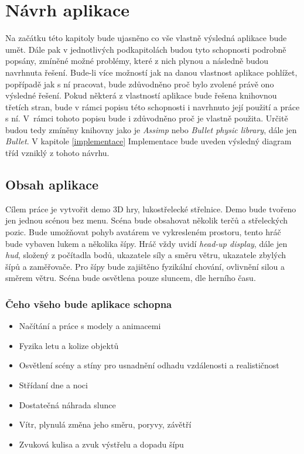 \chapter{Návrh aplikace}\label{Navrh_aplikace}
Na začátku této kapitoly bude ujasněno co vše vlastně výsledná aplikace bude umět. Dále pak v jednotlivých podkapitolách budou tyto schopnosti podrobně popsány, zmíněné možné problémy, které z nich plynou a následně budou navrhnuta řešení. Bude-li více možností jak na danou vlastnost aplikace pohlížet, popřípadě jak s ní pracovat,  bude zdůvodněno proč bylo zvolené právě ono výsledné řešení. Pokud některá z vlastností aplikace bude řešena knihovnou třetích stran, bude v rámci popisu této schopnosti i navrhnuto její použití a práce s ní. V~rámci tohoto popisu bude i zdůvodněno proč je vlastně použita. Určitě budou tedy zmíněny knihovny jako je \emph{Assimp}\cite{assimp}  nebo \emph{Bullet physic library}\cite{bullet}, dále jen \emph{Bullet}. V kapitole \ref{implementace} Implementace  bude uveden výsledný diagram tříd vzniklý z tohoto návrhu.
\section{Obsah aplikace}
Cílem práce je vytvořit demo 3D hry, lukostřelecké střelnice. Demo bude tvořeno jen jednou scénou bez menu. Scéna bude obsahovat několik terčů a střeleckých pozic. Bude umožňovat pohyb avatárem ve vykresleném prostoru, tento hráč bude vybaven  lukem a několika šípy. Hráč vždy uvidí \emph{head-up display}, dále jen \emph{hud}, složený z počítadla bodů, ukazatele síly a směru větru, ukazatele zbylých šípů a zaměřovače. Pro šípy bude zajištěno fyzikální chování, ovlivnění silou a směrem větru. Scéna bude osvětlena pouze sluncem, dle herního času.
\subsection{Čeho všeho bude aplikace schopna}
\begin{itemize}
	\item Načítání a práce s modely a animacemi
	\item Fyzika letu a kolize objektů
	\item Osvětlení scény a stíny pro usnadnění odhadu vzdálenosti a realističnost
	\item Střídaní dne a noci
	\item Dostatečná náhrada slunce
	\item Vítr, plynulá změna jeho směru, poryvy, závětří
	\item Zvuková kulisa a zvuk výstřelu a dopadu šípu
\end{itemize}
